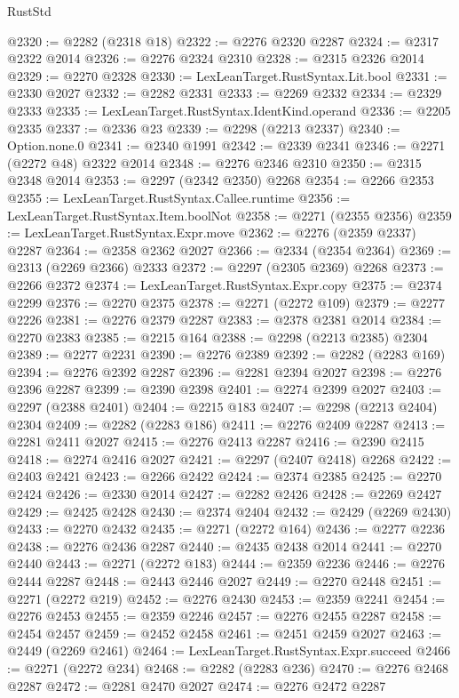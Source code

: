 \begin{lexlean}{RustStd}
\begin{coremodule}
@2320 := @2282 (@2318 @18)
@2322 := @2276 @2320 @2287
@2324 := @2317 @2322 @2014
@2326 := @2276 @2324 @2310
@2328 := @2315 @2326 @2014
@2329 := @2270 @2328
@2330 := LexLeanTarget.RustSyntax.Lit.bool
@2331 := @2330 @2027
@2332 := @2282 @2331
@2333 := @2269 @2332
@2334 := @2329 @2333
@2335 := LexLeanTarget.RustSyntax.IdentKind.operand
@2336 := @2205 @2335
@2337 := @2336 @23
@2339 := @2298 (@2213 @2337)
@2340 := Option.none.{0}
@2341 := @2340 @1991
@2342 := @2339 @2341
@2346 := @2271 (@2272 @48) @2322 @2014
@2348 := @2276 @2346 @2310
@2350 := @2315 @2348 @2014
@2353 := @2297 (@2342 @2350) @2268
@2354 := @2266 @2353
@2355 := LexLeanTarget.RustSyntax.Callee.runtime
@2356 := LexLeanTarget.RustSyntax.Item.boolNot
@2358 := @2271 (@2355 @2356)
@2359 := LexLeanTarget.RustSyntax.Expr.move
@2362 := @2276 (@2359 @2337) @2287
@2364 := @2358 @2362 @2027
@2366 := @2334 (@2354 @2364)
@2369 := @2313 (@2269 @2366) @2333
@2372 := @2297 (@2305 @2369) @2268
@2373 := @2266 @2372
@2374 := LexLeanTarget.RustSyntax.Expr.copy
@2375 := @2374 @2299
@2376 := @2270 @2375
@2378 := @2271 (@2272 @109)
@2379 := @2277 @2226
@2381 := @2276 @2379 @2287
@2383 := @2378 @2381 @2014
@2384 := @2270 @2383
@2385 := @2215 @164
@2388 := @2298 (@2213 @2385) @2304
@2389 := @2277 @2231
@2390 := @2276 @2389
@2392 := @2282 (@2283 @169)
@2394 := @2276 @2392 @2287
@2396 := @2281 @2394 @2027
@2398 := @2276 @2396 @2287
@2399 := @2390 @2398
@2401 := @2274 @2399 @2027
@2403 := @2297 (@2388 @2401)
@2404 := @2215 @183
@2407 := @2298 (@2213 @2404) @2304
@2409 := @2282 (@2283 @186)
@2411 := @2276 @2409 @2287
@2413 := @2281 @2411 @2027
@2415 := @2276 @2413 @2287
@2416 := @2390 @2415
@2418 := @2274 @2416 @2027
@2421 := @2297 (@2407 @2418) @2268
@2422 := @2403 @2421
@2423 := @2266 @2422
@2424 := @2374 @2385
@2425 := @2270 @2424
@2426 := @2330 @2014
@2427 := @2282 @2426
@2428 := @2269 @2427
@2429 := @2425 @2428
@2430 := @2374 @2404
@2432 := @2429 (@2269 @2430)
@2433 := @2270 @2432
@2435 := @2271 (@2272 @164)
@2436 := @2277 @2236
@2438 := @2276 @2436 @2287
@2440 := @2435 @2438 @2014
@2441 := @2270 @2440
@2443 := @2271 (@2272 @183)
@2444 := @2359 @2236
@2446 := @2276 @2444 @2287
@2448 := @2443 @2446 @2027
@2449 := @2270 @2448
@2451 := @2271 (@2272 @219)
@2452 := @2276 @2430
@2453 := @2359 @2241
@2454 := @2276 @2453
@2455 := @2359 @2246
@2457 := @2276 @2455 @2287
@2458 := @2454 @2457
@2459 := @2452 @2458
@2461 := @2451 @2459 @2027
@2463 := @2449 (@2269 @2461)
@2464 := LexLeanTarget.RustSyntax.Expr.succeed
@2466 := @2271 (@2272 @234)
@2468 := @2282 (@2283 @236)
@2470 := @2276 @2468 @2287
@2472 := @2281 @2470 @2027
@2474 := @2276 @2472 @2287

\end{coremodule}
\end{lexlean}
